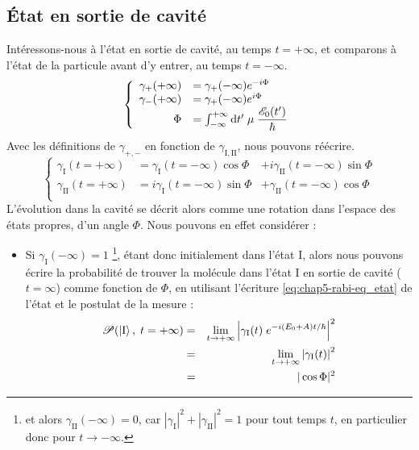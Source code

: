 \documentclass[../notesdecours.tex]{subfiles}
\begin{document}
\subsection{État en sortie de cavité}
Intéressons-nous à l'état en sortie de cavité, au temps $t=+\infty$, et comparons à l'état de la particule avant d'y entrer, au temps $t=-\infty$.
$$\left\{ 
    \begin{array}{rl}
        \gamma_+(+\infty) &= \gamma_+(-\infty) e^{-i\Phi} \\
        \gamma_-(+\infty) &= \gamma_+(-\infty) e^{i\Phi} \\
        \Phi &= \int_{-\infty}^{+\infty}\mathrm{d}t'\; \mu\;  \dfrac{\mathcal{E}_0(t')}{\hbar}
    \end{array}
    \right.$$
    Avec les définitions de $\gamma_{+, -}$ en fonction de $\gamma_\mathrm{I, II}$, nous pouvons réécrire.
$$\left\{ 
    \begin{array}{lll}
        \gamma_\mathrm{I}(t=+\infty) &= \gamma_\mathrm{I}(t=-\infty) \cos\Phi &+ i \gamma_\mathrm{II}(t=-\infty)\sin\Phi \\
        \gamma_\mathrm{II}(t=+\infty) &= i\gamma_\mathrm{I}(t=-\infty) \sin\Phi &+ \gamma_\mathrm{II}(t=-\infty)\cos\Phi \\
    \end{array}
\right.$$
L'évolution dans la cavité se décrit alors comme une rotation dans l'espace des états propres, d'un angle $\Phi$. Nous pouvons en effet considérer :
\begin{itemize}[label=$\blacktriangleright$]
    \item Si $\gamma_\mathrm{I}(-\infty) =1$ \footnote{et alors  $\gamma_\mathrm{II}(-\infty) = 0$, car $|\gamma_\mathrm{I}|^2 +|\gamma_\mathrm{II}|^2 = 1$ pour tout temps $t$, en particulier donc pour $t\rightarrow -\infty$.}, étant donc initialement dans l'état I, alors nous pouvons écrire la probabilité de trouver la molécule dans l'état I en sortie de cavité ($t=\infty$) comme fonction de $\Phi$, en utilisant l'écriture \eqref{eq:chap5-rabi-eq_etat} de l'état et le postulat de la mesure : \\
    \begin{eqnarray*}        
        \mathcal{P}(\ket{\mathrm{I}}, \; t=+\infty) &=& \lim_{t\rightarrow +\infty}\left|  \gamma_\mathrm{I}(t) \; e^{-i(E_0+A) t/\hbar} \right|^2 \\
        &=&\lim_{t\rightarrow +\infty}\left|  \gamma_\mathrm{I}(t)\right|^2 \\
        &=&|\cos\Phi|^2
    \end{eqnarray*}
    {\color{red}{Insérer graphique!}}
\end{itemize}
\end{document}
